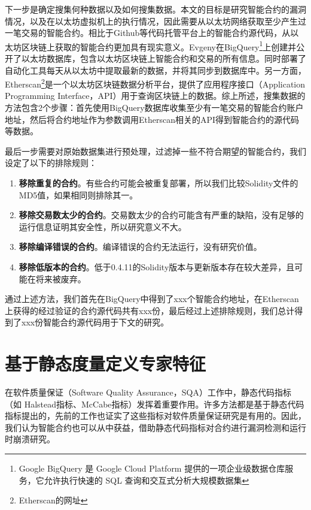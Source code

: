 下一步是确定搜集何种数据以及如何搜集数据。本文的目标是研究智能合约的漏洞情况，以及在以太坊虚拟机上的执行情况，因此需要从以太坊网络获取至少产生过一笔交易的智能合约。相比于Github等代码托管平台上的智能合约源代码，从以太坊区块链上获取的智能合约更加具有现实意义。Evgeny\cite{bigquery_ethereum}在BigQuery\footnote{Google BigQuery 是 Google Cloud Platform 提供的一项企业级数据仓库服务，它允许执行快速的 SQL 查询和交互式分析大规模数据集}上创建并公开了以太坊数据库，包含以太坊区块链上智能合约和交易的所有信息。同时部署了自动化工具每天从以太坊中提取最新的数据，并将其同步到数据库中。另一方面，Etherscan\footnote{Etherscan的网址}是一个以太坊区块链数据分析平台，提供了应用程序接口（Application Programming Interface，API）用于查询区块链上的数据。综上所述，搜集数据的方法包含2个步骤：首先使用BigQuery数据库收集至少有一笔交易的智能合约账户地址，然后将合约地址作为参数调用Etherscan相关的API得到智能合约的源代码等数据。


最后一步需要对原始数据集进行预处理，过滤掉一些不符合期望的智能合约，我们设定了以下的排除规则：
\begin{enumerate}
    \item \textbf{移除重复的合约}。有些合约可能会被重复部署，所以我们比较Solidity文件的MD5值，如果相同则排除其一。
    \item \textbf{移除交易数太少的合约}。交易数太少的合约可能含有严重的缺陷，没有足够的运行信息证明其安全性，所以研究意义不大。
    \item \textbf{移除编译错误的合约}。编译错误的合约无法运行，没有研究价值。
    \item \textbf{移除低版本的合约}。低于0.4.11的Solidity版本与更新版本存在较大差异，且可能在将来被废弃。
\end{enumerate}

通过上述方法，我们首先在BigQuery中得到了xxx个智能合约地址，在Etherscan上获得的经过验证的合约源代码共有xxx份，最后经过上述排除规则，我们总计得到了xxx份智能合约源代码用于下文的研究。

\section{基于静态度量定义专家特征}
在软件质量保证（Software Quality Assurance，SQA）工作中，静态代码指标（如 Halstead\cite{halstead}指标、McCabe\cite{mccabe}指标）发挥着重要作用。许多方法都是基于静态代码指标提出的，先前的工作\cite{menzies2007data,meyers2007empirical,zimmermann2007predicting}也证实了这些指标对软件质量保证研究是有用的。因此，我们认为智能合约也可以从中获益，借助静态代码指标对合约进行漏洞检测和运行时崩溃研究。

